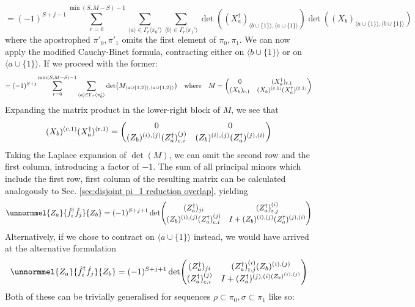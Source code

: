 \documentclass[12pt]{article}
\newcommand{\seq}[1]{\langle #1\rangle}
\newcommand{\hc}{^\dagger}
\begin{document}
	\begin{equation}
	=(-1)^{S+j-1}\sum_{r=0}^{\min(S, M-S)-1}\sum_{\seq{a}\in\Gamma_{r}\seq{\pi_0'}}\sum_{\seq{b}\in\Gamma_{r}\seq{\pi_1'}}\det((X_a\hc)_{\seq{b\cup\{1\}},\seq{a\cup\{1\}}})\det((X_b)_{\seq{a\cup\{1\}}, \seq{b\cup\{1\}}})
	\end{equation}
	where the apostrophed $\pi'_0, \pi'_1$ omits the first element of $\pi_0, \pi_1$. We can now apply the modified Cauchy-Binet formula, contracting either on $\seq{b\cup\{1\}}$ or on $\seq{a\cup\{1\}}$. If we proceed with the former:
	\begin{equation*}
	=(-1)^{S+j}\sum_{r=0}^{\min(S, M-S)-1}\sum_{\seq{a}\in\Gamma_{r}\seq{\pi_0'}}\det(M_{\seq{a\cup\{1,2\}}, \seq{a\cup\{1,2\}}})\qq{where}M=\mqty(
		0 & (X_a\hc)_{\text{r.} 1}\\
		(X_b)_{\text{c.} 1} & (X_b)^{(\text{c.} 1)}(X_a\hc)^{(\text{r.} 1)}
	)
	\end{equation*}
	Expanding the matrix product in the lower-right block of $M$, we see that
	\begin{equation*}
	(X_b)^{(\text{c.} 1)}(X_a\hc)^{(\text{r.} 1)}=\mqty(
		0 & 0\\
		(Z_b)^{(i),(j)}(Z_a\hc)^{(j)}_{\text{c.} i} & (Z_b)^{(i),(j)}(Z_a\hc)^{(j),(i)}
	)
	\end{equation*}
	Taking the Laplace expansion of $\det(M)$, we can omit the second row and the first column, introducing a factor of $-1$. The sum of all principal minors which include the first row, first column of the resulting matrix can be calculated analogously to Sec. \ref{sec:disjoint pi_1 reduction overlap}, yielding
	\begin{equation}
	\unnormmel{Z_a}{\hat{f}\hc_i\hat{f}_j}{Z_b}=(-1)^{S+j+1}\det(\mqty{
		(Z_a\hc)_{ji} & (Z_a\hc)^{(i)}_{\text{r.} j}\\
		(Z_b)^{(i),(j)}(Z_a\hc)^{(j)}_{\text{c.} i} & I+(Z_b)^{(i),(j)}(Z_a\hc)^{(j),(i)}
	})
	\end{equation}
	Alternatively, if we chose to contract on $\seq{a\cup\{1\}}$ instead, we would have arrived at the alternative formulation
	\begin{equation}
	\unnormmel{Z_a}{\hat{f}\hc_i\hat{f}_j}{Z_b}=(-1)^{S+j+1}\det(\mqty{
		(Z_a\hc)_{ji} & (Z_a\hc)^{(i)}_{\text{r.} j}(Z_b)^{(i),(j)}\\
		(Z_a\hc)^{(j)}_{\text{c.} i} & I+(Z_a\hc)^{(j),(i)(Z_b)^{(i),(j)}}
	})
	\end{equation}
	Both of these can be trivially generalised for sequences $\rho\subset\pi_0,\sigma\subset\pi_1$ like so:
\end{document}
